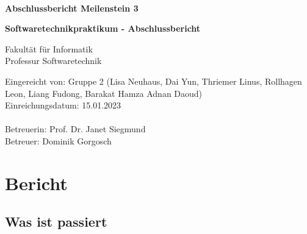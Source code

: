 \documentclass[a4paper, 12pt, oneside, BCOR1cm,toc=chapterentrywithdots]{scrbook}
\begin{document}
\begin{titlepage}

{
    \begin{center}
        \\
    \end{center}
    \vspace{0.5cm}
}

\begin{center}

\LARGE{\textbf{Abschlussbericht Meilenstein 3}}\\
\vspace{1cm}


\Large{\textbf{Softwaretechnikpraktikum - Abschlussbericht}}\\ 
\vspace{1cm}

Fakultät für Informatik\\
Professur Softwaretechnik
\end{center}
\vspace{3cm}
Eingereicht von: Gruppe 2 (Lisa Neuhaus, Dai Yun, Thriemer Linus, Rollhagen Leon, Liang Fudong, Barakat Hamza Adnan Daoud)\\
Einreichungsdatum: 15.01.2023\\
\vspace{0.3cm}\\
Betreuerin: Prof. Dr. Janet Siegmund \\
Betreuer: Dominik Gorgosch

\end{titlepage}
\chapter{Bericht}
\section*{Was ist passiert}
\end{document}
